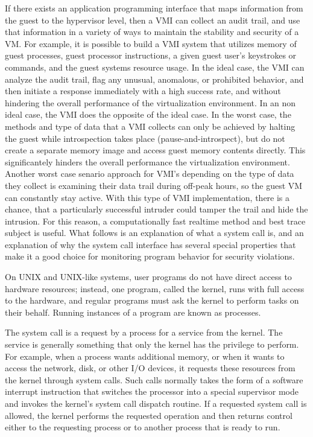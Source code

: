 \documentclass{report}
\begin{document}
\begin{spacing}{1.5}
{\large
If there exists an application programming interface that maps information from the guest to the hypervisor level, then a VMI can collect an audit trail, and use that information in a variety of ways to maintain the stability and security of a VM. For example, it is possible to build a VMI system that utilizes memory of guest processes, guest processor instructions, a given guest user’s keystrokes or commands, and the guest systems resource usage. In the ideal case, the VMI can analyze the audit trail, flag any unusual, anomalous, or prohibited behavior, and then initiate a response immediately with a high success rate, and without hindering the overall performance of the virtualization environment. In an non ideal case, the VMI does the opposite of the ideal case. In the worst case, the methods and type of data that a VMI collects can only be achieved by halting the guest while introspection takes place (pause-and-introspect), but do not create a separate memory image and access guest memory contents directly. This significantely hinders the overall performance the virtualization environment. Another worst case senario approach for VMI's depending on the type of data they collect is examining their data trail during off-peak hours, so the guest VM can constantly stay active. With this type of VMI implementation, there is a chance, that a particularly successful intruder could tamper the trail and hide the intrusion. For this reason, a computationally fast realtime method and best trace subject is useful. What follows is an explanation of what a system call is, and an explanation of why the system call interface has several special properties that make it a good choice for monitoring program behavior for security violations.
\newline
}

{\large
 
On UNIX and UNIX-like systems, user programs do not have direct access to hardware resources; instead, one program, called the kernel, runs with full access to the hardware, and regular programs must ask the kernel to perform tasks on their behalf. Running instances of a program are known as processes.

The system call is a request by a process for a service from the kernel. The service is generally something that only the kernel has the privilege to perform. For example, when a process wants additional memory, or when it wants to access the network,
disk, or other I/O devices, it requests these resources from the kernel through system calls. Such calls normally takes the form of a software interrupt instruction that switches the processor into a special supervisor mode and invokes the kernel’s system call dispatch routine. If a requested system call is allowed, the kernel performs the requested operation and then returns control either to the requesting process or to
another process that is ready to run.


}
\end{spacing}
\end{document}
